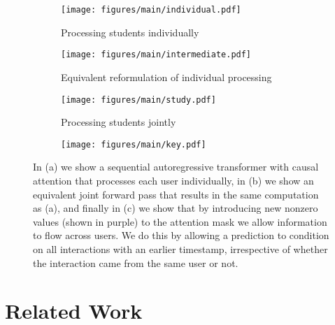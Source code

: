 \documentclass{article}
\begin{document}
\newcommand\MultiplierIndivdual{166.33}
\newcommand\MultiplierIntermediate{165.1}
\newcommand\MultiplierKey{17}
\newcommand\MultiplierScale{0.0019\linewidth}
\begin{figure}
    
    \begin{subfigure}[t]{0.31602\linewidth}
        \texttt{[image: figures/main/individual.pdf]}
        \caption{Processing students individually}
    \end{subfigure}
    \hfill
    \begin{subfigure}[t]{0.3136\linewidth}
        \texttt{[image: figures/main/intermediate.pdf]}
        \caption{Equivalent reformulation of individual processing}
    \end{subfigure}
    \hfill
       \begin{subfigure}[t]{0.3136\linewidth}
        \texttt{[image: figures/main/study.pdf]}
        \caption{Processing students jointly}
    \end{subfigure}
    
    \begin{subfigure}[t]{0.0323\linewidth}
     
      \texttt{[image: figures/main/key.pdf]}
    \end{subfigure}
    \caption{In (a) we show a sequential autoregressive transformer with causal attention that processes each user individually, in (b) we show an equivalent joint forward pass that results in the same computation as (a), and finally in (c) we show that by introducing new nonzero values (shown in purple) to the attention mask we allow information to flow across users. We do this by allowing a prediction to condition on all interactions with an earlier timestamp, irrespective of whether the interaction came from the same user or not.}
    \label{figure:main}
\end{figure}


\section{Related Work}
\label{sec:related}
\end{document}
